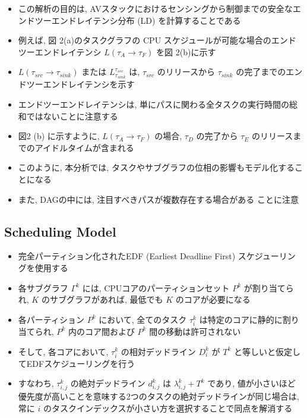 \begin{frame}{}
    \begin{itemize}
        \item この解析の目的は, AVスタックにおけるセンシングから制御までの安全なエンドツーエンドレイテンシ分布 (LD) を計算することである
        \item 例えば, 図 2(a)のタスクグラフの CPU スケジュールが可能な場合のエンドツーエンドレイテンシ $L\left(\tau_{A} \rightarrow \tau_{F}\right)$ を図 2(b)に示す
        \item $L\left(\tau_{s r c} \rightarrow \tau_{s i n k}\right)$ または $L_{\tau_{s i n k}}^{\tau_{s s c}}$ は, $\tau_{s r c}$ のリリースから $\tau_{s i n k}$ の完了までのエンドツーエンドレイテンシを示す
        \item エンドツーエンドレイテンシは, 単にパスに関わる全タスクの実行時間の総和ではないことに注意する
        \item 図2 (b) に示すように, $L\left(\tau_{A} \rightarrow \tau_{F}\right)$ の場合, $\tau_{D}$ の完了から $\tau_{E}$ のリリースまでのアイドルタイムが含まれる
        \item このように, 本分析では, タスクやサブグラフの位相の影響もモデル化することになる
        \item また, DAGの中には, 注目すべきパスが複数存在する場合がある ことに注意
    \end{itemize}
\end{frame}


\subsection{Scheduling Model}
\label{ssec: scheduling model}

\begin{frame}{}
    \begin{itemize}
        \item 完全パーティション化されたEDF (Earliest Deadline First) スケジューリングを使用する
        \item 各サブグラフ $\Gamma^{k}$ には, CPUコアのパーティションセット $P^{k}$ が割り当てられ, $K$ のサブグラフがあれば, 最低でも $K$ のコアが必要になる
        \item 各パーティション $P^{k}$ において, 全てのタスク $\tau_{i}^{k}$ は特定のコアに静的に割り当てられ, $P^{k}$ 内のコア間および $P^{k}$ 間の移動は許可されない
        \item そして, 各コアにおいて, $\tau_{i}^{k}$ の相対デッドライン $D_{i}^{k}$ が $T^{k}$ と等しいと仮定してEDFスケジューリングを行う
        \item すなわち, $\tau_{i, j}^{k}$ の絶対デッドライン $d_{i, j}^{k}$ は $\lambda_{i, j}^{k}+T^{k}$ であり, 値が小さいほど優先度が高いことを意味する2つのタスクの絶対デッドラインが同じ場合は, 常に $i$ のタスクインデックスが小さい方を選択することで同点を解消する
    \end{itemize}
\end{frame}

